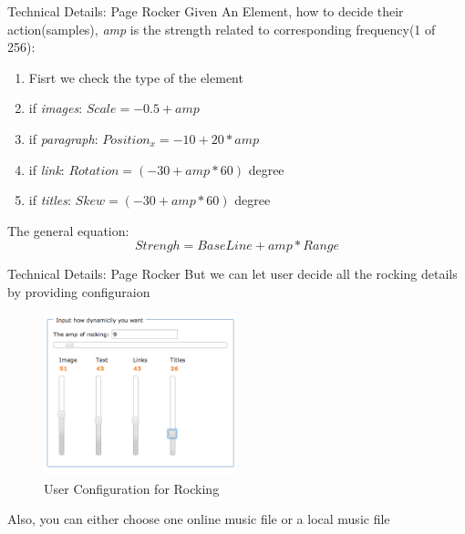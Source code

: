 \documentclass{beamer}
\begin{document}
\begin{frame}{Technical Details: Page Rocker}
    Given An Element, how to decide their action(samples), \emph{amp} is the strength related to corresponding frequency(1 of 256):
\begin{enumerate}
    \item Fisrt we check the type of the element
    \item if \emph{images}: $Scale = -0.5 + amp $
    \item if \emph{paragraph}: $Position_{x} = -10 + 20 * amp$
    \item if \emph{link}: $Rotation = (-30 + amp * 60)$ degree
    \item if \emph{titles}: $Skew = (-30 + amp * 60)$ degree
\end{enumerate}

The general equation:
\begin{equation}
    Strengh = BaseLine + amp * Range
\end{equation}
\end{frame}

\begin{frame}{Technical Details: Page Rocker}
But we can let user decide all the rocking details by providing configuraion
\begin{center}
    \begin{figure}
        \includegraphics[width=0.5\textwidth]{./images/amp_configuration.png}
        \caption{User Configuration for Rocking}
    \end{figure}
\end{center}
Also, you can either choose one online music file or a local music file
\end{frame}
\end{document}
